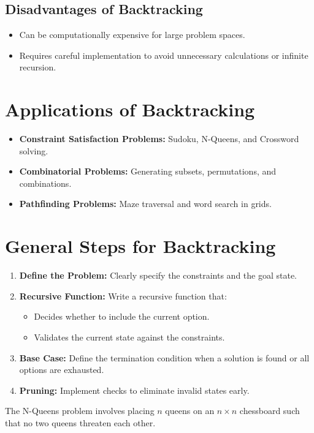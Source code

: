 \subsection*{Disadvantages of Backtracking}
\begin{itemize}
    \item Can be computationally expensive for large problem spaces.
    \item Requires careful implementation to avoid unnecessary calculations or infinite recursion.
\end{itemize}

\section*{Applications of Backtracking}
\begin{itemize}
    \item \textbf{Constraint Satisfaction Problems:} Sudoku, N-Queens, and Crossword solving.
    \item \textbf{Combinatorial Problems:} Generating subsets, permutations, and combinations.
    \item \textbf{Pathfinding Problems:} Maze traversal and word search in grids.
\end{itemize}

\section*{General Steps for Backtracking}
\begin{enumerate}
    \item \textbf{Define the Problem:} Clearly specify the constraints and the goal state.
    \item \textbf{Recursive Function:} Write a recursive function that:
        \begin{itemize}
            \item Decides whether to include the current option.
            \item Validates the current state against the constraints.
        \end{itemize}
    \item \textbf{Base Case:} Define the termination condition when a solution is found or all options are exhausted.
    \item \textbf{Pruning:} Implement checks to eliminate invalid states early.
\end{enumerate}

\label{problem:N-Queens_Problem}
The N-Queens problem involves placing \( n \) queens on an \( n \times n \) chessboard such that no two queens threaten each other.

